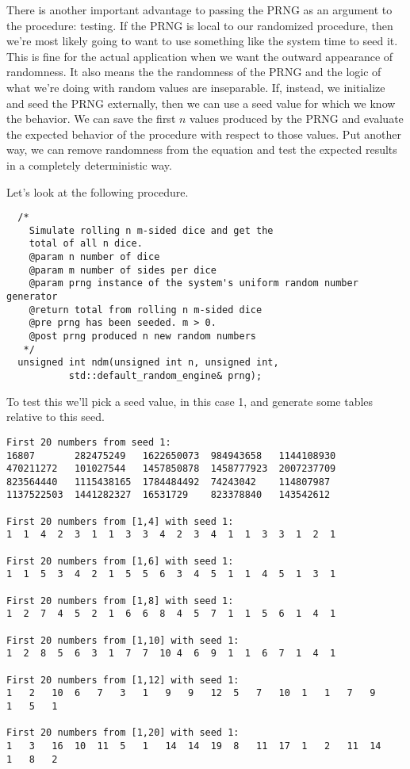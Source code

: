 \documentclass[]{tufte-handout}
\begin{document}
There is another important advantage to passing the PRNG as an argument to the procedure: testing. If the PRNG is local to our randomized procedure, then we're most likely going to want to use something like the system time to seed it. This is fine for the actual application when we want the outward appearance of randomness.  It also means the the randomness of the PRNG and the logic of what we're doing with random values are inseparable. If, instead, we initialize and seed the PRNG externally, then we can use a seed value for which we know the behavior. We can save the first $n$ values produced by the PRNG and evaluate the expected behavior of the procedure with respect to those values.  Put another way, we can remove randomness from the equation and test the expected results in a completely deterministic way.

Let's look at the following procedure.
\begin{verbatim}
  /*
    Simulate rolling n m-sided dice and get the 
    total of all n dice.
    @param n number of dice
    @param m number of sides per dice
    @param prng instance of the system's uniform random number generator
    @return total from rolling n m-sided dice
    @pre prng has been seeded. m > 0. 
    @post prng produced n new random numbers
   */
  unsigned int ndm(unsigned int n, unsigned int,
		   std::default_random_engine& prng);
\end{verbatim}

To test this we'll pick a seed value, in this case 1, and generate some tables relative to this seed.
\begin{verbatim}
First 20 numbers from seed 1:
16807       282475249   1622650073  984943658   1144108930  
470211272   101027544   1457850878  1458777923  2007237709  
823564440   1115438165  1784484492  74243042    114807987   
1137522503  1441282327  16531729    823378840   143542612   

First 20 numbers from [1,4] with seed 1:
1  1  4  2  3  1  1  3  3  4  2  3  4  1  1  3  3  1  2  1  

First 20 numbers from [1,6] with seed 1:
1  1  5  3  4  2  1  5  5  6  3  4  5  1  1  4  5  1  3  1  

First 20 numbers from [1,8] with seed 1:
1  2  7  4  5  2  1  6  6  8  4  5  7  1  1  5  6  1  4  1  

First 20 numbers from [1,10] with seed 1:
1  2  8  5  6  3  1  7  7  10 4  6  9  1  1  6  7  1  4  1  

First 20 numbers from [1,12] with seed 1:
1   2   10  6   7   3   1   9   9   12  5   7   10  1   1   7   9   
1   5   1   

First 20 numbers from [1,20] with seed 1:
1   3   16  10  11  5   1   14  14  19  8   11  17  1   2   11  14  
1   8   2   
\end{verbatim}
\end{document}
